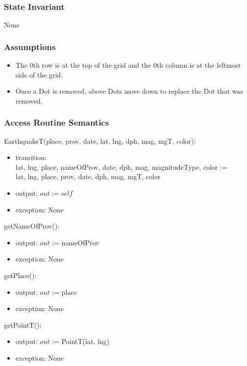 \documentclass[12pt]{article}
\begin{document}
\subsubsection* {State Invariant}

None

\subsubsection* {Assumptions}

\begin{itemize}
\item The 0th row is at the top of the grid and the 0th column
  is at the leftmost side of the grid.
\item Once a Dot is removed, above Dots move down to replace the Dot that was removed.
\end{itemize}

\medskip

\subsubsection* {Access Routine Semantics}

EarthquakeT(place, prov, date, lat, lng, dph, mag, mgT, color):
\begin{itemize}
\item transition: \\ lat, lng, place, nameOfProv, date, dph, mag, magnitudeType, color :=\\
  lat, lng, place, prov, date, dph, mag, mgT, color
\item output: $\mathit{out} := \mathit{self}$
\item exception: None
\end{itemize}

\noindent getNameOfProv():
\begin{itemize}
\item output: $out$ := nameOfProv
\item exception: None
\end{itemize}

\noindent getPlace():
\begin{itemize}
\item output: $out$ := place
\item exception: None
\end{itemize}

\noindent getPointT():
\begin{itemize}
\item output: $out$ := PointT(lat, lng)
\item exception: None
\end{itemize}
\end{document}
